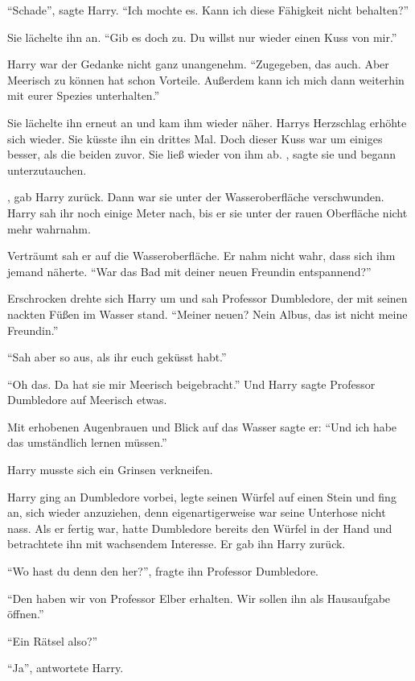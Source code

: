 \enquote{Schade}, sagte Harry. \enquote{Ich mochte es. Kann ich diese Fähigkeit nicht behalten?}

Sie lächelte ihn an. \enquote{Gib es doch zu. Du willst nur wieder einen Kuss von mir.}

Harry war der Gedanke nicht ganz unangenehm. \enquote{Zugegeben, das auch. Aber Meerisch zu können hat schon Vorteile. Außerdem kann ich mich dann weiterhin mit eurer Spezies unterhalten.}

Sie lächelte ihn erneut an und kam ihm wieder näher. Harrys Herzschlag erhöhte sich wieder. Sie küsste ihn ein drittes Mal. Doch dieser Kuss war um einiges besser, als die beiden zuvor. Sie ließ wieder von ihm ab. , sagte sie und begann unterzutauchen.

, gab Harry zurück. Dann war sie unter der Wasseroberfläche verschwunden. Harry sah ihr noch einige Meter nach, bis er sie unter der rauen Oberfläche nicht mehr wahrnahm.

Verträumt sah er auf die Wasseroberfläche. Er nahm nicht wahr, dass sich ihm jemand näherte. \enquote{War das Bad mit deiner neuen Freundin entspannend?}

Erschrocken drehte sich Harry um und sah Professor Dumbledore, der mit seinen nackten Füßen im Wasser stand. \enquote{Meiner neuen? Nein Albus, das ist nicht meine Freundin.}

\enquote{Sah aber so aus, als ihr euch geküsst habt.}

\enquote{Oh das. Da hat sie mir Meerisch beigebracht.} Und Harry sagte Professor Dumbledore auf Meerisch etwas.

Mit erhobenen Augenbrauen und Blick auf das Wasser sagte er: \enquote{Und ich habe das umständlich lernen müssen.}

Harry musste sich ein Grinsen verkneifen.

Harry ging an Dumbledore vorbei, legte seinen Würfel auf einen Stein und fing an, sich wieder anzuziehen, denn eigenartigerweise war seine Unterhose nicht nass. Als er fertig war, hatte Dumbledore bereits den Würfel in der Hand und betrachtete ihn mit wachsendem Interesse. Er gab ihn Harry zurück.

\enquote{Wo hast du denn den her?}, fragte ihn Professor Dumbledore.

\enquote{Den haben wir von Professor Elber erhalten. Wir sollen ihn als Hausaufgabe öffnen.}

\enquote{Ein Rätsel also?}

\enquote{Ja}, antwortete Harry.

